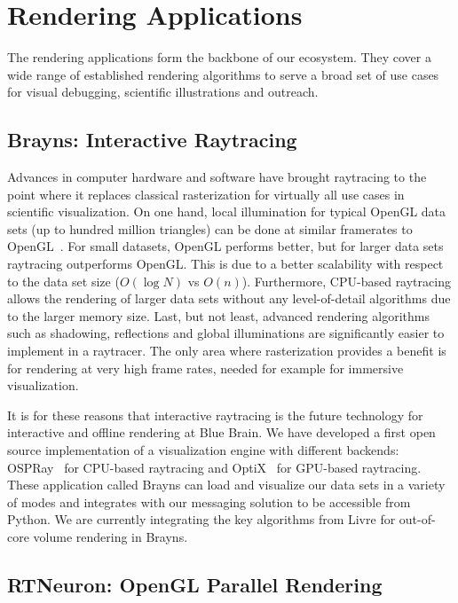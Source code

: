 \documentclass[10pt]{llncs}
\newcommand{\FIXME}[1]{\textbf{\color{BLUE}{FIXME: #1}}}
\begin{document}
\section{Rendering Applications}

The rendering applications form the backbone of our ecosystem. They cover a
wide range of established rendering algorithms to serve a broad set of use
cases for visual debugging, scientific illustrations and outreach.

\subsection{Brayns: Interactive Raytracing}

Advances in computer hardware and software have brought raytracing to the point
where it replaces classical rasterization for virtually all use cases in
scientific visualization. On one hand, local illumination for typical OpenGL
data sets (up to hundred million triangles) can be done at similar framerates
to OpenGL~\cite{ospray}. For small datasets, OpenGL performs better, but for
larger data sets raytracing outperforms OpenGL. This is due to a better
scalability with respect to the data set size ($O(\log{N})$ vs $O(n)$).
Furthermore, CPU-based raytracing allows the rendering of larger data sets
without any level-of-detail algorithms due to the larger memory size. Last, but
not least, advanced rendering algorithms such as shadowing, reflections and
global illuminations are significantly easier to implement in a raytracer. The
only area where rasterization provides a benefit is for rendering at very high
frame rates, needed for example for immersive visualization.

It is for these reasons that interactive raytracing is the future technology for
interactive and offline rendering at Blue Brain. We have developed a first open
source implementation of a visualization engine with different backends:
OSPRay~\cite{ospray} for CPU-based raytracing and OptiX~\cite{optix} for
GPU-based raytracing. These application called Brayns can load and visualize
our data sets in a variety of modes and integrates with our messaging solution
to be accessible from Python. We are currently integrating the key algorithms
from Livre for out-of-core volume rendering in Brayns.

\FIXME{teaser gallery}

\subsection{RTNeuron: OpenGL Parallel Rendering}
\end{document}
